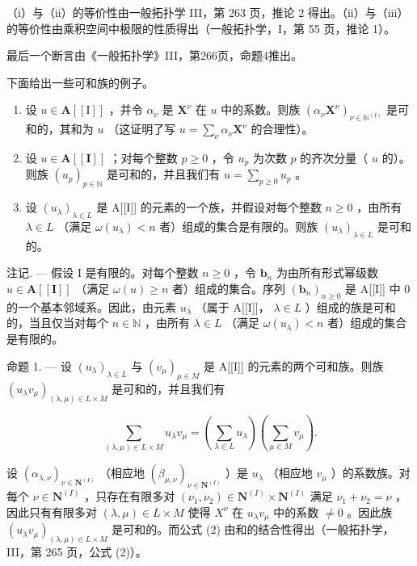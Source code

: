 （i）与（ii）的等价性由一般拓扑学 III，第 263 页，推论 2 得出。（ii）与（iii）的等价性由乘积空间中极限的性质得出（一般拓扑学，I，第 55 页，推论 1）。

最后一个断言由《一般拓扑学》III，第266页，命题4推出。

下面给出一些可和族的例子。

\begin{enumerate}
\def\labelenumi{\alph{enumi})}
\item
  设 \(u \in \mathbf{A}[[\mathrm{I}]]\) ，并令 \(\alpha_{\nu}\) 是 \(\mathbf{X}^{\nu}\) 在 \(u\) 中的系数。则族 \((\alpha_{\nu}\mathbf{X}^{\nu})_{\nu \in \mathbb{N}^{(I)}}\) 是可和的，其和为 \(u\) （这证明了写 \(u = \sum_{\nu} \alpha_{\nu}\mathbf{X}^{\nu}\) 的合理性）。
\item
  设 \(u \in \mathbf{A}[[\mathbf{I}]]\) ；对每个整数 \(p \geqslant 0\) ，令 \(u_p\) 为次数 \(p\) 的齐次分量（ \(u\) 的）。则族 \((u_p)_{p \in \mathbb{N}}\) 是可和的，并且我们有 \(u = \sum_{p \geqslant 0} u_p\) 。
\item
  设 \((u_{\lambda})_{\lambda \in L}\) 是 A{[}{[}I{]}{]} 的元素的一个族，并假设对每个整数 \(n \geqslant 0\) ，由所有 \(\lambda \in L\) （满足 \(\omega(u_{\lambda}) < n\) 者）组成的集合是有限的。则族 \((u_{\lambda})_{\lambda \in L}\) 是可和的。
\end{enumerate}

注记. --- 假设 I 是有限的。对每个整数 \(n \geqslant 0\) ，令 \(\mathbf{b}_n\) 为由所有形式幂级数 \(u \in \mathbf{A}[[\mathbf{I}]]\) （满足 \(\omega(u) \geqslant n\) 者）组成的集合。序列 \((\mathbf{b}_n)_{n \geqslant 0}\) 是 A{[}{[}I{]}{]} 中 0 的一个基本邻域系。因此，由元素 \(u_{\lambda}\) （属于 A{[}{[}I{]}{]}， \(\lambda \in L\) ）组成的族是可和的，当且仅当对每个 \(n \in \mathbb{N}\) ，由所有 \(\lambda \in L\) （满足 \(\omega(u_{\lambda}) < n\) 者）组成的集合是有限的。

命题 1. --- 设 \((u_{\lambda})_{\lambda \in L}\) 与 \((v_{\mu})_{\mu \in M}\) 是 A{[}{[}I{]}{]} 的元素的两个可和族。则族 \((u_{\lambda}v_{\mu})_{(\lambda, \mu) \in L \times M}\) 是可和的，并且我们有

\[
\sum_ {(\lambda , \mu) \in L \times M} u _ {\lambda} v _ {\mu} = \left(\sum_ {\lambda \in L} u _ {\lambda}\right) \left(\sum_ {\mu \in M} v _ {\mu}\right).\tag{2}
\]

设 \((\alpha_{\lambda, \nu})_{\nu \in \mathbf{N}^{(I)}}\) （相应地 \((\beta_{\mu, \nu})_{\nu \in \mathbf{N}^{(I)}}\) ）是 \(u_{\lambda}\) （相应地 \(v_{\mu}\) ）的系数族。对每个 \(\nu \in \mathbf{N}^{(I)}\) ，只存在有限多对 \((\nu_1, \nu_2) \in \mathbf{N}^{(I)} \times \mathbf{N}^{(I)}\) 满足 \(\nu_1 + \nu_2 = \nu\) ，因此只有有限多对 \((\lambda, \mu) \in L \times M\) 使得 \(X^{\nu}\) 在 \(u_{\lambda}v_{\mu}\) 中的系数 \(\neq 0\) 。因此族 \((u_{\lambda}v_{\mu})_{(\lambda, \mu) \in L \times M}\) 是可和的。而公式 (2) 由和的结合性得出（一般拓扑学，III，第 265 页，公式 (2)）。

